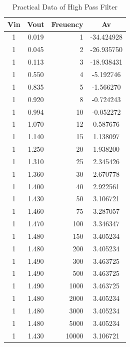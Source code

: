 \documentclass[12pt]{article}
\begin{document}
\begin{table}[htpb]
    \centering
    \caption{Practical Data of High Pass Filter}
    \begin{tabular}{ccrc}
        \hline
        Vin &  Vout & Freuency & Av         \\
        \hline          
        1 & 0.019   &        1 & -34.424928  \\
        1 & 0.045   &        2 & -26.935750  \\
        1 & 0.113   &        3 & -18.938431  \\
        1 & 0.550   &        4 &  -5.192746  \\
        1 & 0.835   &        5 &  -1.566270  \\
        1 & 0.920   &        8 &  -0.724243  \\
        1 & 0.994   &       10 &  -0.052272  \\
        1 & 1.070   &       12 &   0.587676  \\
        1 & 1.140   &       15 &   1.138097  \\
        1 & 1.250   &       20 &   1.938200  \\
        1 & 1.310   &       25 &   2.345426  \\
        1 & 1.360   &       30 &   2.670778  \\
        1 & 1.400   &       40 &   2.922561  \\
        1 & 1.430   &       50 &   3.106721  \\
        1 & 1.460   &       75 &   3.287057  \\
        1 & 1.470   &      100 &   3.346347  \\
        1 & 1.480   &      150 &   3.405234  \\
        1 & 1.480   &      200 &   3.405234  \\
        1 & 1.490   &      300 &   3.463725  \\
        1 & 1.490   &      500 &   3.463725  \\
        1 & 1.490   &     1000 &   3.463725  \\
        1 & 1.480   &     2000 &   3.405234  \\
        1 & 1.480   &     3000 &   3.405234  \\
        1 & 1.480   &     5000 &   3.405234  \\
        1 & 1.430   &    10000 &   3.106721  \\
        \hline
    \end{tabular}
\end{table}
\end{document}
